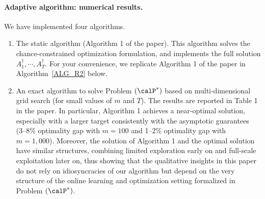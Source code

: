 \documentclass[11pt]{article}
\begin{document}
\paragraph{Adaptive algorithm: numerical results.} We have implemented four algorithms.
\begin{enumerate}
    \item The static algorithm (Algorithm 1 of the paper). This algorithm solves the chance-constrained optimization formulation, and implements the full solution $A^\dagger_1,\cdots,A^\dagger_T$. For your convenience, we replicate Algorithm 1 of the paper in Algorithm~\ref{ALG_R2} below.
    \begin{algorithm} [h!]
    \caption{Algorithm to solve Problem $(\calP^*)$.}\small
    \label{ALG_R2}
    \end{algorithm}
    
    \item An exact algorithm to solve Problem $(\calP^*)$ based on multi-dimensional grid search (for small values of $m$ and $T$). The results are reported in Table 1 in the paper. In particular, Algorithm 1 achieves a near-optimal solution, especially with a larger target consistently with the asymptotic guarantees (3--8\% optimality gap with $m=100$ and 1--2\% optimality gap with $m=1,000$). Moreover, the solution of Algorithm 1 and the optimal solution have similar structures, combining limited exploration early on and full-scale exploitation later on, thus showing that the qualitative insights in this paper do not rely on idiosyncracies of our algorithm but depend on the very structure of the online learning and optimization setting formalized in Problem $(\calP^*)$.
    

\end{enumerate}
\end{document}

